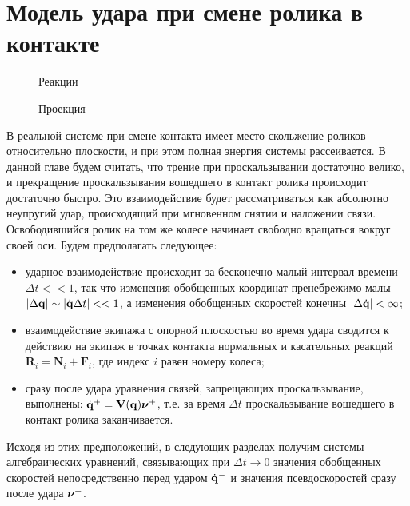 \section{Модель удара при смене ролика в контакте}

\begin{figure}[h]
        \centering
        \caption{Реакции}
        \label{fig:react}
    \endminipage
        \centering
        \caption{Проекция}
        \label{fig:project}
    \endminipage
\end{figure}

В реальной системе при смене контакта имеет место скольжение роликов относительно плоскости, и при этом полная энергия системы рассеивается. В данной главе будем считать, что трение при проскальзывании достаточно велико, и прекращение проскальзывания вошедшего в контакт ролика происходит достаточно быстро. Это взаимодействие будет рассматриваться как абсолютно неупругий удар, происходящий при мгновенном снятии и наложении связи. Освободившийся ролик на том же колесе начинает свободно вращаться вокруг своей оси.
Будем предполагать следующее:
\begin{itemize}
    \item ударное взаимодействие происходит за бесконечно малый интервал времени $\Delta t << 1$, так что изменения обобщенных координат пренебрежимо малы $|\Delta \mathbf{q}| \sim |\dot{\mathbf{q}}\Delta t| << 1$, а изменения обобщенных скоростей конечны $|\Delta \dot{\mathbf{q}}| < \infty$;
    \item взаимодействие экипажа с опорной плоскостью во время удара сводится к действию на экипаж в точках контакта нормальных и касательных реакций $\mathbf{R}_i = \mathbf{N}_i + \mathbf{F}_i$, где индекс $i$ равен номеру колеса;
    \item сразу после удара 
    уравнения связей, запрещающих проскальзывание, выполнены: $\dot{\mathbf{q}}^+ = \mathbf{V}(\mathbf{q})\boldsymbol{\mathbf{\nu}}^+$, т.е. за время $\Delta t$ проскальзывание вошедшего в контакт ролика заканчивается.
\end{itemize}


Исходя из этих предположений, в следующих разделах получим системы алгебраических уравнений, связывающих при $\Delta t \rightarrow 0$ значения обобщенных скоростей непосредственно перед ударом $\dot{\mathbf{q}}^-$ и значения псевдоскоростей сразу после удара $\boldsymbol{\mathbf{\nu}}^+$.

